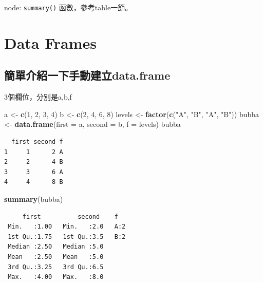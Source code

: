 \documentclass[]{book}
\newenvironment{Shaded}{\begin{snugshade}}{\end{snugshade}}
\newcommand{\DataTypeTok}[1]{\textcolor[rgb]{0.13,0.29,0.53}{#1}}
\newcommand{\DecValTok}[1]{\textcolor[rgb]{0.00,0.00,0.81}{#1}}
\newcommand{\KeywordTok}[1]{\textcolor[rgb]{0.13,0.29,0.53}{\textbf{#1}}}
\newcommand{\NormalTok}[1]{#1}
\newcommand{\StringTok}[1]{\textcolor[rgb]{0.31,0.60,0.02}{#1}}
\theoremstyle{definition}
\theoremstyle{definition}
\theoremstyle{definition}
\theoremstyle{remark}
\begin{document}
node: \texttt{summary()} 函數，參考table一節。

\hypertarget{data-frames}{%
\section{Data Frames}\label{data-frames}}

\hypertarget{data.frame}{%
\subsection{簡單介紹一下手動建立data.frame}\label{data.frame}}

3個欄位，分別是a,b,f

\begin{Shaded}
\begin{Highlighting}[]
\NormalTok{a <-}\StringTok{ }\KeywordTok{c}\NormalTok{(}\DecValTok{1}\NormalTok{, }\DecValTok{2}\NormalTok{, }\DecValTok{3}\NormalTok{, }\DecValTok{4}\NormalTok{)}
\NormalTok{b <-}\StringTok{ }\KeywordTok{c}\NormalTok{(}\DecValTok{2}\NormalTok{, }\DecValTok{4}\NormalTok{, }\DecValTok{6}\NormalTok{, }\DecValTok{8}\NormalTok{)}
\NormalTok{levels <-}\StringTok{ }\KeywordTok{factor}\NormalTok{(}\KeywordTok{c}\NormalTok{(}\StringTok{"A"}\NormalTok{, }\StringTok{"B"}\NormalTok{, }\StringTok{"A"}\NormalTok{, }\StringTok{"B"}\NormalTok{))}
\NormalTok{bubba <-}\StringTok{ }\KeywordTok{data.frame}\NormalTok{(}\DataTypeTok{first =}\NormalTok{ a,}
                      \DataTypeTok{second =}\NormalTok{ b,}
                      \DataTypeTok{f =}\NormalTok{ levels)}
\NormalTok{bubba}
\end{Highlighting}
\end{Shaded}

\begin{verbatim}
  first second f
1     1      2 A
2     2      4 B
3     3      6 A
4     4      8 B
\end{verbatim}

\begin{Shaded}
\begin{Highlighting}[]
\KeywordTok{summary}\NormalTok{(bubba)}
\end{Highlighting}
\end{Shaded}

\begin{verbatim}
     first          second    f    
 Min.   :1.00   Min.   :2.0   A:2  
 1st Qu.:1.75   1st Qu.:3.5   B:2  
 Median :2.50   Median :5.0        
 Mean   :2.50   Mean   :5.0        
 3rd Qu.:3.25   3rd Qu.:6.5        
 Max.   :4.00   Max.   :8.0        
\end{verbatim}
\end{document}
